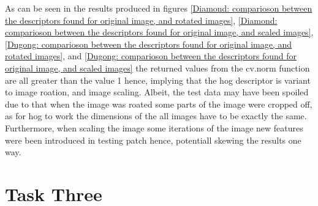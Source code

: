 \documentclass[conference]{IEEEtran}
\begin{document}
As can be seen in the results produced in figures \ref{Diamond: comparioson between the descriptors found for original image, and rotated images}, \ref{Diamond: comparioson between the descriptors found for original image, and scaled images}, \ref{Dugong: comparioson between the descriptors found for original image, and rotated images}, and \ref{Dugong: comparioson between the descriptors found for original image, and scaled images} the returned values from the cv.norm function are all greater than the value 1 hence, implying that the hog descriptor is variant to image roation, and image scaling. Albeit, the test data may have been spoiled due to that when the image was roated some  parts of the image were cropped off, as for hog to work the dimensions of the all images have to be exactly the same. Furthermore, when scaling the image some iterations of the image new features were been introduced in testing patch hence, potentiall skewing the results one way.\par

\section{Task Three} \label{three} 
\end{document}
